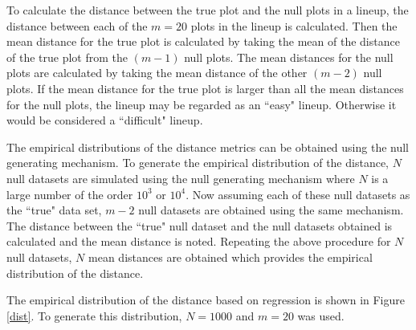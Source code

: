 \documentclass[12]{article}
\begin{document}
To calculate the distance between the true plot and the null plots in a lineup, the distance between each of the $m = 20$ plots in the lineup is calculated. Then the mean distance for the true plot is calculated by taking the mean of the distance of the true plot from the $(m - 1)$ null plots. The mean distances for the null plots are calculated by taking the mean distance of the other $(m - 2)$ null plots. If the mean distance for the true plot is larger than all the mean distances for the null plots, the lineup may be regarded as an ``easy" lineup. Otherwise it would be considered a ``difficult" lineup.


The empirical distributions of the distance metrics can be obtained using the null generating mechanism. To generate the empirical distribution of the distance, $N$ null datasets are simulated using the null generating mechanism where $N$ is a large number of the order $10^3$ or $10^4$. Now assuming each of these null datasets as the ``true" data set, $m - 2$ null datasets are obtained using the same mechanism. The distance between the ``true" null dataset and the null datasets obtained is calculated and the mean distance is noted. Repeating the above procedure for $N$ null datasets, $N$ mean distances are obtained which provides the empirical distribution of the distance.

The empirical distribution of the distance based on regression is shown in Figure \ref{dist}. To generate this distribution, $N = 1000$ and $m = 20$ was used. 
\end{document}
